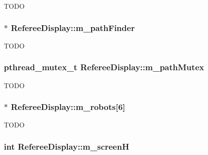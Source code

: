 \label{classRefereeDisplay_a582b6bcc0204a2876b629e8ceebc8abd}
TODO \hypertarget{classRefereeDisplay_a0ccee8231a72e1a906dff856e072d5a0}{
\subsubsection[{m\_\-pathFinder}]{$\ast$ {\bf RefereeDisplay::m\_\-pathFinder}}}
\label{classRefereeDisplay_a0ccee8231a72e1a906dff856e072d5a0}
TODO \hypertarget{classRefereeDisplay_a2ec44bb3c993cb8e518a730153116da7}{
\subsubsection[{m\_\-pathMutex}]{\setlength{\rightskip}{0pt plus 5cm}pthread\_\-mutex\_\-t {\bf RefereeDisplay::m\_\-pathMutex}}}
\label{classRefereeDisplay_a2ec44bb3c993cb8e518a730153116da7}
TODO \hypertarget{classRefereeDisplay_a4a777a38327f96fe1e5c9051b6c3c38f}{
\subsubsection[{m\_\-robots}]{$\ast$ {\bf RefereeDisplay::m\_\-robots}\mbox{[}6\mbox{]}}}
\label{classRefereeDisplay_a4a777a38327f96fe1e5c9051b6c3c38f}
TODO \hypertarget{classRefereeDisplay_a136af0a18d0eadffbcaa755fdf76e328}{
\subsubsection[{m\_\-screenH}]{\setlength{\rightskip}{0pt plus 5cm}int {\bf RefereeDisplay::m\_\-screenH}}}
